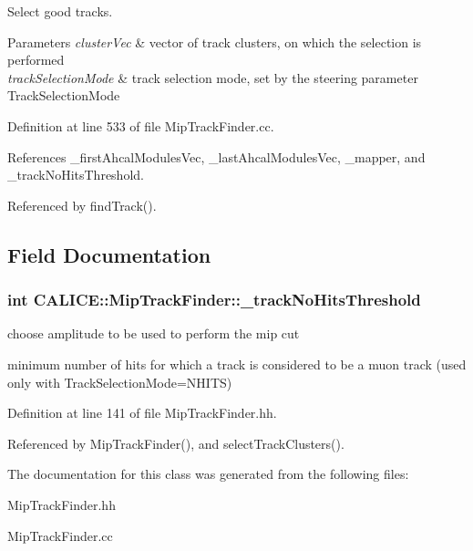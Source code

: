 Select good tracks. 


\begin{DoxyParams}{Parameters}
{\em cluster\-Vec} & vector of track clusters, on which the selection is performed \\
\hline
{\em track\-Selection\-Mode} & track selection mode, set by the steering parameter Track\-Selection\-Mode \\
\hline
\end{DoxyParams}


Definition at line 533 of file Mip\-Track\-Finder.\-cc.



References \-\_\-first\-Ahcal\-Modules\-Vec, \-\_\-last\-Ahcal\-Modules\-Vec, \-\_\-mapper, and \-\_\-track\-No\-Hits\-Threshold.



Referenced by find\-Track().



\subsection{Field Documentation}
\subsubsection[{\-\_\-track\-No\-Hits\-Threshold}]{\setlength{\rightskip}{0pt plus 5cm}int C\-A\-L\-I\-C\-E\-::\-Mip\-Track\-Finder\-::\-\_\-track\-No\-Hits\-Threshold\hspace{0.3cm}{\ttfamily [private]}}\label{classCALICE_1_1MipTrackFinder_aacb0b30277254b471bd8d368fa340931}


choose amplitude to be used to perform the mip cut 

minimum number of hits for which a track is considered to be a muon track (used only with Track\-Selection\-Mode=N\-H\-I\-T\-S) 

Definition at line 141 of file Mip\-Track\-Finder.\-hh.



Referenced by Mip\-Track\-Finder(), and select\-Track\-Clusters().



The documentation for this class was generated from the following files\-:\begin{DoxyCompactItemize}
\item 
Mip\-Track\-Finder.\-hh\item 
Mip\-Track\-Finder.\-cc\end{DoxyCompactItemize}
